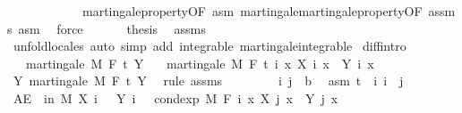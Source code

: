 \begin{isabellebody}
\ \ \ \ \ \ \ \ \ \ \ \ martingale{\isacharunderscore}{\kern0pt}property{\isacharbrackleft}{\kern0pt}OF\ asm{\isacharbrackright}{\kern0pt}\ martingale{\isachardot}{\kern0pt}martingale{\isacharunderscore}{\kern0pt}property{\isacharbrackleft}{\kern0pt}OF\ assms\ asm{\isacharbrackright}{\kern0pt}\ \isamarkupfalse%
\ force\isanewline
\ \ \isacommand{{\isacharbraceright}{\kern0pt}}\isamarkupfalse%
\isanewline
\ \ \isamarkupfalse%
\ {\isacharquery}{\kern0pt}thesis\ \isamarkupfalse%
\ assms\isanewline
\ \ \isamarkupfalse%
\ {\isacharparenleft}{\kern0pt}unfold{\isacharunderscore}{\kern0pt}locales{\isacharparenright}{\kern0pt}\ {\isacharparenleft}{\kern0pt}auto\ simp\ add{\isacharcolon}{\kern0pt}\ integrable\ martingale{\isachardot}{\kern0pt}integrable{\isacharparenright}{\kern0pt}\isanewline
{}\isamarkupfalse%
%
\endisatagproof
{\isafoldproof}%
%
\isadelimproof
\isanewline
%
\endisadelimproof
\isanewline
{}\isamarkupfalse%
\ diff{\isacharbrackleft}{\kern0pt}intro{\isacharbrackright}{\kern0pt}{\isacharcolon}{\kern0pt}\isanewline
\ \ \ {\isachardoublequoteopen}martingale\ M\ F\ t\ Y{\isachardoublequoteclose}\isanewline
\ \ \ {\isachardoublequoteopen}martingale\ M\ F\ t\ {\isacharparenleft}{\kern0pt}{\isasymlambda}i\ x{\isachardot}{\kern0pt}\ X\ i\ x\ {\isacharminus}{\kern0pt}\ Y\ i\ x{\isacharparenright}{\kern0pt}{\isachardoublequoteclose}\isanewline
%
\isadelimproof
%
\endisadelimproof
%
\isatagproof
{}\isamarkupfalse%
\ {\isacharminus}{\kern0pt}\isanewline
\ \ \isamarkupfalse%
\ Y{\isacharcolon}{\kern0pt}\ martingale\ M\ F\ t\ Y\ \isamarkupfalse%
\ {\isacharparenleft}{\kern0pt}rule\ assms{\isacharparenright}{\kern0pt}\isanewline
\ \ \isacommand{{\isacharbraceleft}{\kern0pt}}\isamarkupfalse%
\isanewline
\ \ \ \ \isamarkupfalse%
\ i\ j\ {\isacharcolon}{\kern0pt}{\isacharcolon}{\kern0pt}\ {\isacharprime}{\kern0pt}b\ \isamarkupfalse%
\ asm{\isacharcolon}{\kern0pt}\ {\isachardoublequoteopen}t\ {\isasymle}\ i{\isachardoublequoteclose}\ {\isachardoublequoteopen}i\ {\isasymle}\ j{\isachardoublequoteclose}\isanewline
\ \ \ \ \isamarkupfalse%
\ {\isachardoublequoteopen}AE\ {\isasymxi}\ in\ M{\isachardot}{\kern0pt}\ X\ i\ {\isasymxi}\ {\isacharminus}{\kern0pt}\ Y\ i\ {\isasymxi}\ {\isacharequal}{\kern0pt}\ cond{\isacharunderscore}{\kern0pt}exp\ M\ {\isacharparenleft}{\kern0pt}F\ i{\isacharparenright}{\kern0pt}\ {\isacharparenleft}{\kern0pt}{\isasymlambda}x{\isachardot}{\kern0pt}\ X\ j\ x\ {\isacharminus}{\kern0pt}\ Y\ j\ x{\isacharparenright}{\kern0pt}\ {\isasymxi}{\isachardoublequoteclose}\ \isanewline

\end{isabellebody}

